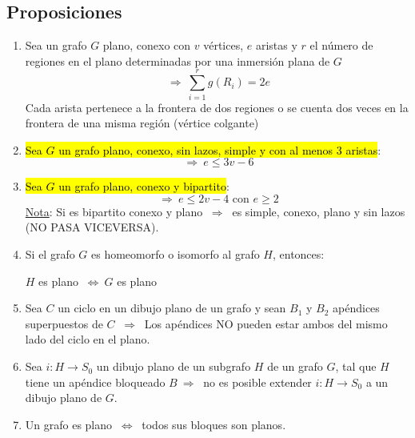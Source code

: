 \documentclass{article}
\newcommand{\Rightarrows}{\: \Rightarrow \:}            %
\newcommand{\Leftrightarrows}{\: \Leftrightarrow \:}    %
\newcommand{\sumatoria}[2]{\sum_{#1} ^{#2}}
\begin{document}
\subsection{Proposiciones}
\begin{enumerate}
    \item Sea un grafo $G$ plano, conexo con $v$ vértices, $e$ aristas y $r$ el número de regiones en el plano determinadas por una inmersión plana de $G$
    \begin{equation*}
        \Rightarrows \sumatoria{i = 1}{r} g(R_i) = 2e
    \end{equation*}
    Cada arista pertenece a la frontera de dos regiones o se cuenta dos veces en la frontera de una misma región (vértice colgante)
    \item \hl{Sea $G$ un grafo plano, conexo, sin lazos, simple y con al menos 3 aristas}:
    \begin{equation*}
        \Rightarrows e \leq 3v - 6
    \end{equation*}
    \item \hl{Sea $G$ un grafo plano, conexo y bipartito}:
    \begin{equation*}
        \Rightarrows e \leq 2v - 4 \text{ con } e \geq 2
    \end{equation*}
    \underline{Nota}: 
    Si es bipartito conexo y plano $\Rightarrows$ es simple, conexo, plano y sin lazos (NO PASA VICEVERSA).
    \item Si el grafo $G$ es homeomorfo o isomorfo al grafo $H$, entonces:
    \begin{center}
        $H$ es plano $\Leftrightarrows G$ es plano
    \end{center}
    \item Sea $C$ un ciclo en un dibujo plano de un grafo y sean $B_1$ y $B_2$
apéndices superpuestos de $C$ $\Rightarrows$ Los apéndices NO pueden estar ambos del
mismo lado del ciclo en el plano.
    \item Sea $i : H \rightarrow S_0$ un dibujo plano de un subgrafo $H$ de un grafo $G$, tal que 
$H$ tiene un apéndice bloqueado $B \Rightarrows$ no es posible extender $i : H \rightarrow S_0$ a un 
dibujo plano de $G$.
    \item Un grafo es plano $\Leftrightarrows$ todos sus bloques son planos.
\end{enumerate}

\end{document}
